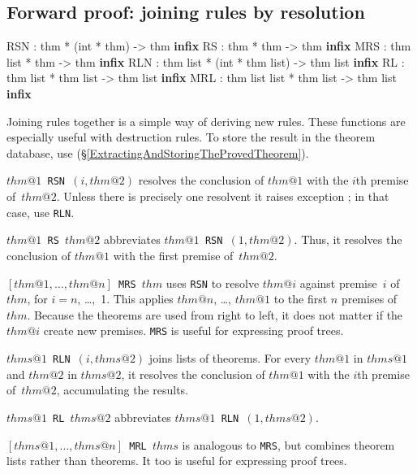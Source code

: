 \subsection{Forward proof: joining rules by resolution}
\begin{ttbox} 
RSN : thm * (int * thm) -> thm                 \hfill\textbf{infix}
RS  : thm * thm -> thm                         \hfill\textbf{infix}
MRS : thm list * thm -> thm                    \hfill\textbf{infix}
RLN : thm list * (int * thm list) -> thm list  \hfill\textbf{infix}
RL  : thm list * thm list -> thm list          \hfill\textbf{infix}
MRL : thm list list * thm list -> thm list     \hfill\textbf{infix}
\end{ttbox}
Joining rules together is a simple way of deriving new rules.  These
functions are especially useful with destruction rules.  To store
the result in the theorem database, use 
(\S\ref{ExtractingAndStoringTheProvedTheorem}). 
\begin{ttdescription}
\item[\tt$thm@1$ RSN $(i,thm@2)$]  
  resolves the conclusion of $thm@1$ with the $i$th premise of~$thm@2$.
  Unless there is precisely one resolvent it raises exception
  ; in that case, use {\tt RLN}.

\item[\tt$thm@1$ RS $thm@2$]  
abbreviates \hbox{\tt$thm@1$ RSN $(1,thm@2)$}.  Thus, it resolves the
conclusion of $thm@1$ with the first premise of~$thm@2$.

\item[\tt {$[thm@1,\ldots,thm@n]$} MRS $thm$]  
  uses {\tt RSN} to resolve $thm@i$ against premise~$i$ of $thm$, for
  $i=n$, \ldots,~1.  This applies $thm@n$, \ldots, $thm@1$ to the first $n$
  premises of $thm$.  Because the theorems are used from right to left, it
  does not matter if the $thm@i$ create new premises.  {\tt MRS} is useful
  for expressing proof trees.

\item[\tt$thms@1$ RLN $(i,thms@2)$]  
  joins lists of theorems.  For every $thm@1$ in $thms@1$ and $thm@2$ in
  $thms@2$, it resolves the conclusion of $thm@1$ with the $i$th premise
  of~$thm@2$, accumulating the results. 

\item[\tt$thms@1$ RL $thms@2$]  
abbreviates \hbox{\tt$thms@1$ RLN $(1,thms@2)$}. 

\item[\tt {$[thms@1,\ldots,thms@n]$} MRL $thms$]  
is analogous to {\tt MRS}, but combines theorem lists rather than theorems.
It too is useful for expressing proof trees.
\end{ttdescription}


